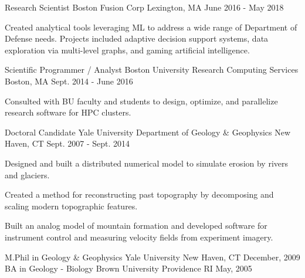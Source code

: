 \documentclass[11pt, a4paper]{awesome-cv}
\begin{document}
\begin{cventries}
  \cventrytight
    {Research Scientist}
    {Boston Fusion Corp}
    {Lexington, MA}
    {June 2016 - May 2018}
    {
      \begin{cvitems}
        \item {Created analytical tools leveraging ML to address a wide range of Department of Defense needs. Projects included adaptive decision support systems, data exploration via multi-level graphs, and gaming artificial intelligence.}
      \end{cvitems}
    }

  \cventrytight
    {Scientific Programmer / Analyst}
    {Boston University Research Computing Services}
    {Boston, MA}
    {Sept. 2014 - June 2016}
    {
      \begin{cvitems}
        \item {Consulted with BU faculty and students to design, optimize, and parallelize research software for HPC clusters.} 
      \end{cvitems}
    }

  \cventrytight
    {Doctoral Candidate}
    {Yale University Department of Geology \& Geophysics}
    {New Haven, CT}
    {Sept. 2007 - Sept. 2014}
    {
      \begin{cvitems}
        \item {Designed and built a distributed numerical model to simulate erosion by rivers and glaciers.}
        \item {Created a method for reconstructing past topography by decomposing and scaling modern topographic features.}
        \item {Built an analog model of mountain formation and developed software for instrument control and measuring velocity fields from experiment imagery.}
      \end{cvitems} 
    }

\end{cventries}

\begin{cventries}
  \cventry
    {M.Phil in Geology \& Geophysics}
    {Yale University}
    {New Haven, CT}
    {December, 2009}
    {}
  \cventry
    {BA in Geology - Biology}
    {Brown University}
    {Providence RI}
    {May, 2005}
    {}
\end{cventries}
\end{document}
